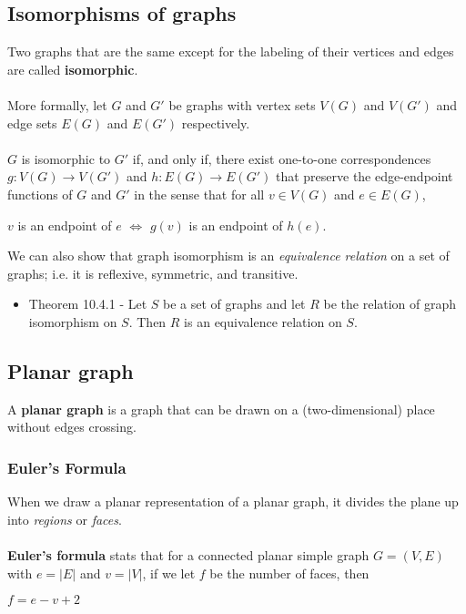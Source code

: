 \documentclass[a4paper]{article}
\begin{document}
\subsection{Isomorphisms of graphs}
Two graphs that are the same except for the labeling of their vertices and edges are called \textbf{isomorphic}.\\\\
More formally, let $G$ and $G'$ be graphs with vertex sets $V(G)$ and $V(G')$ and edge sets $E(G)$ and $E(G')$ respectively.\\\\
$G$ is isomorphic to $G'$ if, and only if, there exist one-to-one correspondences $g: V(G) \rightarrow V(G')$ and $h: E(G) \rightarrow E(G')$ that preserve the edge-endpoint functions of $G$ and $G'$ in the sense that for all $v\in V(G)$ and $e\in E(G)$,
\begin{center}
	$v$ is an endpoint of $e$ $\Longleftrightarrow$ $g(v)$ is an endpoint of $h(e)$.
\end{center}
We can also show that graph isomorphism is an \textit{equivalence relation} on a set of graphs; i.e. it is reflexive, symmetric, and transitive.
\begin{itemize}
	\item[] Theorem 10.4.1 - Let $S$ be a set of graphs and let $R$ be the relation of graph isomorphism on $S$. Then $R$ is an equivalence relation on $S$.
\end{itemize}

\subsection{Planar graph}
A \textbf{planar graph} is a graph that can be drawn on a (two-dimensional) place without edges crossing.
\subsubsection{Euler's Formula}
When we draw a planar representation of a planar graph, it divides the plane up into \textit{regions} or \textit{faces}.\\\\
\textbf{Euler's formula} stats that for a connected planar simple graph $G=(V,E)$ with $e=|E|$ and $v=|V|$, if we let $f$ be the number of faces, then
\begin{center}
	$f=e-v+2$
\end{center} 
\end{document}
